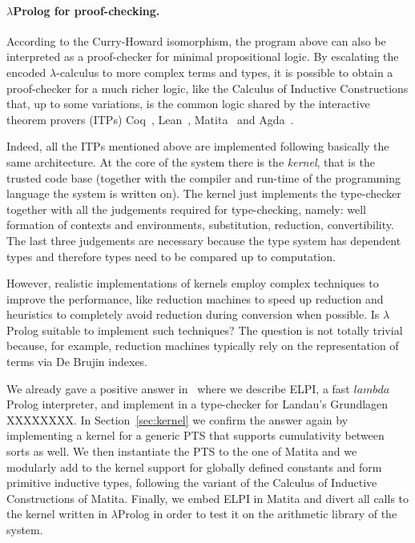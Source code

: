 \documentclass{easychair}
\begin{document}
\paragraph{$\lambda$Prolog for proof-checking.}

According to the Curry-Howard isomorphism, the program above can also
be interpreted as a proof-checker for minimal propositional logic. By
escalating the encoded $\lambda$-calculus to more complex terms and
types, it is possible to obtain a proof-checker for a much richer
logic, like the Calculus of Inductive Constructions that, up to some
variations, is the common logic shared by the interactive theorem
provers (ITPs) Coq~\cite{}, Lean~\cite{}, Matita~\cite{} and
Agda~\cite{}.

Indeed, all the ITPs mentioned above are implemented following
basically the same architecture. At the core of the system there is
the \emph{kernel}, that is the trusted code base (together with the
compiler and run-time of the programming language the system is
written on). The kernel just implements the type-checker together with
all the judgements required for type-checking, namely: well formation
of contexts and environments, substitution, reduction, convertibility.
The last three judgements are necessary because the type system has
dependent types and therefore types need to be compared up to
computation.

However, realistic implementations of kernels employ complex techniques to improve the performance, like reduction machines to speed up reduction and heuristics to completely avoid reduction during conversion when possible. Is $\lambda$Prolog suitable to implement such techniques? The question is not totally trivial because, for example, reduction machines typically rely on the representation of terms via De Brujin indexes.

We already gave a positive answer in~\cite{elpiLPAR} where we describe
ELPI, a fast $lambda$Prolog interpreter, and implement in
a type-checker for Landau's Grundlagen XXXXXXXX.
In Section~\ref{sec:kernel} we confirm the answer again by implementing a
kernel for a generic PTS that supports cumulativity between sorts as well. We
then instantiate the PTS to the one of Matita and we modularly add to the
kernel support for globally defined constants and form primitive inductive
types, following the variant of the Calculus of Inductive Constructions of
Matita. Finally, we embed ELPI in Matita and divert all calls to the kernel
written in $\lambda$Prolog in order to test it on the arithmetic library of
the system.
\end{document}
